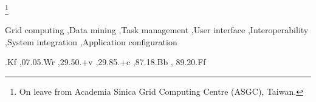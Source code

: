 \documentclass{elsart}
\def\ganga {\textsc{Ganga}\xspace}
\def\grid {Grid\xspace}
\begin{document}
\begin{frontmatter}
\thanks[HurngChun]{On leave from Academia Sinica Grid Computing Centre (ASGC),
  Taiwan.}

\begin{abstract}
  We present the computational task-management tool \ganga, which allows for
  the specification, submission, bookkeeping and post processing of
  computational tasks on a wide set of distributed resources.  \ganga
  effectively provides a homogeneous environment for processing data on
  heterogeneous resources. We give examples from High Energy Physics,
  demonstrating how an analysis can be developed on a local system and then
  transparently moved to a \grid system for processing of all available data.
  \ganga has an API that can be used via an interactive interface, in
  scripts, or through a GUI. Specific knowledge about types of tasks or
  computational resources is provided at run-time through a plugin system, 
  making new developments easy to integrate. We give an overview of the
  \ganga architecture, give examples of current use, and demonstrate how
  \ganga can be used in many different areas of science.
\end{abstract}

\begin{keyword}
Grid computing \sep Data mining \sep Task management \sep User interface \sep Interoperability
\sep System integration  \sep Application configuration






  .Kf \sep 07.05.Wr \sep 29.50.+v \sep 29.85.+c \sep 87.18.Bb \sep
  89.20.Ff
\end{keyword}
\end{frontmatter}

\end{document}

